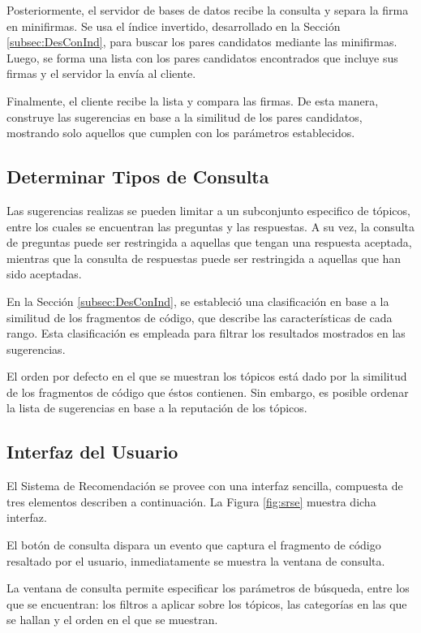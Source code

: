 Posteriormente, el servidor de bases de datos recibe la consulta y separa
la firma en minifirmas. Se usa el índice invertido, desarrollado en la
Sección \ref{subsec:DesConInd}, para buscar los pares candidatos
mediante las minifirmas. Luego, se forma una lista con los pares candidatos
encontrados que incluye sus firmas y el servidor la envía al cliente.

Finalmente, el cliente recibe la lista y compara las firmas. De esta manera,
construye las sugerencias en base a la similitud de los pares candidatos,
mostrando solo aquellos que cumplen con los parámetros establecidos.


\subsection{Determinar Tipos de Consulta}

Las sugerencias realizas se pueden limitar a un subconjunto especifico 
de tópicos, entre los cuales se encuentran las preguntas y las respuestas.
A su vez, la consulta de preguntas puede ser restringida a aquellas
que tengan una respuesta aceptada, mientras que la consulta de respuestas
puede ser restringida a aquellas que han sido aceptadas.

En la Sección \ref{subsec:DesConInd}, se estableció una clasificación
en base a la similitud de los fragmentos de código, que describe las
características de cada rango. Esta clasificación es empleada
para filtrar los resultados mostrados en las sugerencias.

El orden por defecto en el que se muestran los tópicos está dado
por la similitud de los fragmentos de código que éstos contienen.
Sin embargo, es posible ordenar la lista de sugerencias en base
a la reputación de los tópicos.

\subsection{Interfaz del Usuario}

El Sistema de Recomendación se provee con una interfaz
sencilla, compuesta de tres elementos describen a continuación.
La Figura \ref{fig:srse} muestra dicha interfaz.

El botón de consulta dispara un evento que captura
el fragmento de código resaltado por el usuario,
inmediatamente se muestra la ventana de consulta.

La ventana de consulta permite especificar los 
parámetros de búsqueda, entre los que se encuentran:
los filtros a aplicar sobre los tópicos, 
las categorías en las que se hallan
y el orden en el que se muestran.

